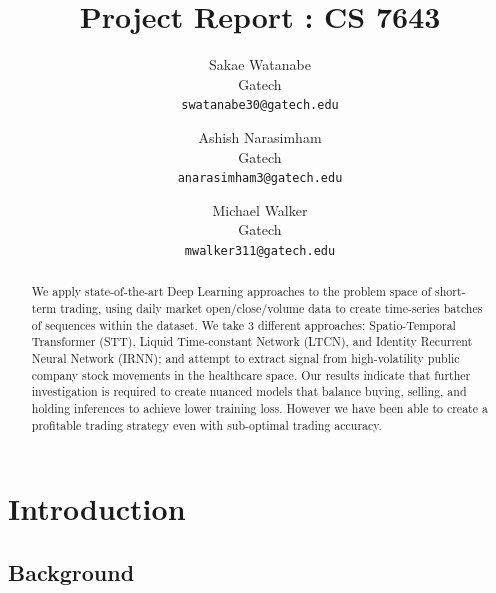 \documentclass[10pt,twocolumn,letterpaper]{article}
\begin{document}
\title{Project Report : CS 7643}

\author{Sakae Watanabe\\
Gatech\\
{\tt\small swatanabe30@gatech.edu}
\and
Ashish Narasimham\\
Gatech\\
{\tt\small anarasimham3@gatech.edu}
\and
Michael Walker\\
Gatech\\
{\tt\small mwalker311@gatech.edu}
}

\maketitle

\begin{abstract}
    We apply state-of-the-art Deep Learning approaches to the problem space of short-term trading, using daily market open/close/volume data to create time-series batches of sequences within the dataset. We take 3 different approaches: Spatio-Temporal Transformer (STT), Liquid Time-constant Network (LTCN), and Identity Recurrent Neural Network (IRNN); and attempt to extract signal from high-volatility public company stock movements in the healthcare space. Our results indicate that further investigation is required to create nuanced models that balance buying, selling, and holding inferences to achieve lower training loss. However we have been able to create a profitable trading strategy even with sub-optimal trading accuracy.

\end{abstract}

\section{Introduction}

\subsection{Background} 
\end{document}
